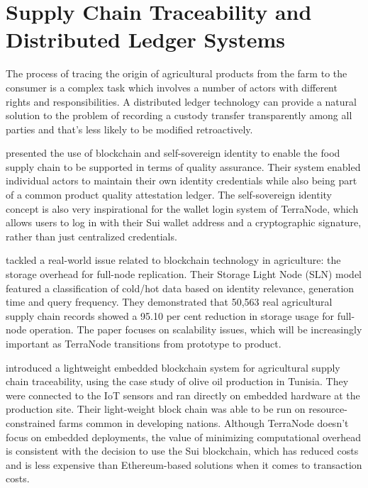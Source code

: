 \section{Supply Chain Traceability and Distributed Ledger Systems}

The process of tracing the origin of agricultural products from the farm to the consumer is a complex task which involves a number of actors with different rights and responsibilities. A distributed ledger technology can provide a natural solution to the problem of recording a custody transfer transparently among all parties and that's less likely to be modified retroactively.

\textcite{cocco2021blockchain} presented the use of blockchain and self-sovereign identity to enable the food supply chain to be supported in terms of quality assurance. Their system enabled individual actors to maintain their own identity credentials while also being part of a common product quality attestation ledger. The self-sovereign identity concept is also very inspirational for the wallet login system of TerraNode, which allows users to log in with their Sui wallet address and a cryptographic signature, rather than just centralized credentials.

\textcite{sun2025storage} tackled a real-world issue related to blockchain technology in agriculture: the storage overhead for full-node replication. Their Storage Light Node (SLN) model featured a classification of cold/hot data based on identity relevance, generation time and query frequency. They demonstrated that 50,563 real agricultural supply chain records showed a 95.10 per cent reduction in storage usage for full-node operation. The paper focuses on scalability issues, which will be increasingly important as TerraNode transitions from prototype to product.

\textcite{ktari2022agricultural} introduced a lightweight embedded blockchain system for agricultural supply chain traceability, using the case study of olive oil production in Tunisia. They were connected to the IoT sensors and ran directly on embedded hardware at the production site. Their light-weight block chain was able to be run on resource-constrained farms common in developing nations. Although TerraNode doesn't focus on embedded deployments, the value of minimizing computational overhead is consistent with the decision to use the Sui blockchain, which has reduced costs and is less expensive than Ethereum-based solutions when it comes to transaction costs.

